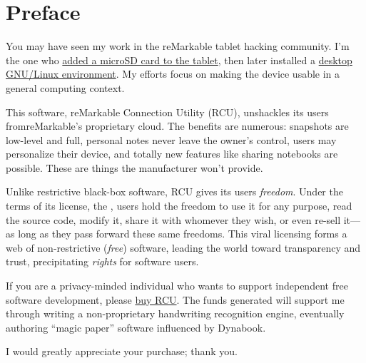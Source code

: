 \newpage

\thispagestyle{empty}\mbox{}\newpage

\renewcommand{\thechapter}{\roman{chapter}}
\chapter{Preface}

You may have seen my work in the reMarkable tablet hacking community. I’m the one who \href{http://www.davisr.me/projects/remarkable-microsd/}{added a microSD card to the tablet}, then later installed a \href{http://www.davisr.me/projects/parabola-rm/}{desktop GNU/Linux environment}. My efforts focus on making the device usable in a general computing context.

This software, reMarkable Connection Utility (RCU), unshackles its users from\break reMarkable's proprietary cloud. The benefits are numerous: snapshots are low-level and full, personal notes never leave the owner's control, users may personalize their device, and totally new features like sharing notebooks are possible. These are things the manufacturer won't provide.

Unlike restrictive black-box software, RCU gives its users \textit{freedom}. Under the terms of its license, the , users hold the freedom to use it for any purpose, read the source code, modify it, share it with whomever they wish, or even re-sell it---as long as they pass forward these same freedoms. This viral licensing forms a web of non-restrictive (\textit{free}) software, leading the world toward transparency and trust, precipitating \textit{rights} for software users.

If you are a privacy-minded individual who wants to support independent free software development, please \href{http://www.davisr.me/projects/rcu/}{buy RCU}. The funds generated will support me through writing a non-proprietary handwriting recognition engine, eventually authoring ``magic paper'' software influenced by Dynabook.

I would greatly appreciate your purchase; thank you.

\vspace{1.5cm}

